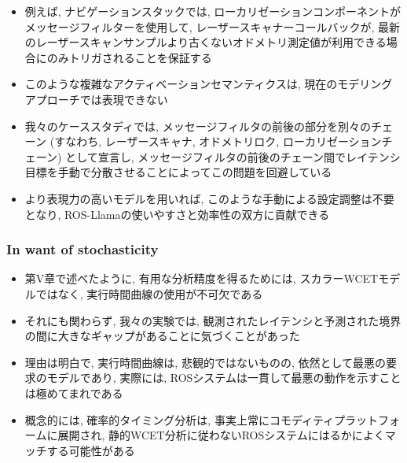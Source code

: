 \begin{frame}{}
    \begin{itemize}
        \item 例えば, ナビゲーションスタックでは, ローカリゼーションコンポーネントがメッセージフィルターを使用して, レーザースキャナーコールバックが, 最新のレーザースキャンサンプルより古くないオドメトリ測定値が利用できる場合にのみトリガされることを保証する
        \item このような複雑なアクティベーションセマンティクスは, 現在のモデリングアプローチでは表現できない
        \item 我々のケーススタディでは, メッセージフィルタの前後の部分を別々のチェーン (すなわち, レーザースキャナ, オドメトリロク, ローカリゼーションチェーン) として宣言し, メッセージフィルタの前後のチェーン間でレイテンシ目標を手動で分散させることによってこの問題を回避している
        \item より表現力の高いモデルを用いれば, このような手動による設定調整は不要となり, ROS-Llamaの使いやすさと効率性の双方に貢献できる
    \end{itemize}
\end{frame}


\subsubsection{In want of stochasticity}
\label{sssec: in want of stochasticity}

\begin{frame}{}
    \begin{itemize}
        \item 第V章で述べたように, 有用な分析精度を得るためには, スカラーWCETモデルではなく, 実行時間曲線の使用が不可欠である
        \item それにも関わらず, 我々の実験では, 観測されたレイテンシと予測された境界の間に大きなギャップがあることに気づくことがあった
    \end{itemize}
\end{frame}

\begin{frame}{}
    \begin{itemize}
        \item 理由は明白で, 実行時間曲線は, 悲観的ではないものの, 依然として最悪の要求のモデルであり, 実際には, ROSシステムは一貫して最悪の動作を示すことは極めてまれである
        \item 概念的には, 確率的タイミング分析は, 事実上常にコモディティプラットフォームに展開され, 静的WCET分析に従わないROSシステムにはるかによくマッチする可能性がある
    \end{itemize}
\end{frame}

